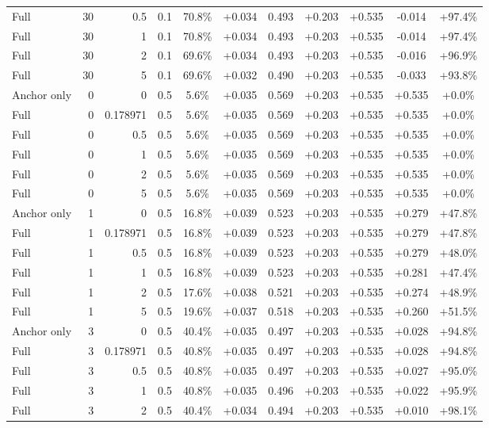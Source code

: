 \begin{table}[htbp]
\begin{tabular}{lrrrccccccc}
Full & 30 & 0.5 & 0.1 & 70.8\% & +0.034 & 0.493 & +0.203 & +0.535 & -0.014 & +97.4\% \\
Full & 30 & 1 & 0.1 & 70.8\% & +0.034 & 0.493 & +0.203 & +0.535 & -0.014 & +97.4\% \\
Full & 30 & 2 & 0.1 & 69.6\% & +0.034 & 0.493 & +0.203 & +0.535 & -0.016 & +96.9\% \\
Full & 30 & 5 & 0.1 & 69.6\% & +0.032 & 0.490 & +0.203 & +0.535 & -0.033 & +93.8\% \\
Anchor only & 0 & 0 & 0.5 & 5.6\% & +0.035 & 0.569 & +0.203 & +0.535 & +0.535 & +0.0\% \\
Full & 0 & 0.178971 & 0.5 & 5.6\% & +0.035 & 0.569 & +0.203 & +0.535 & +0.535 & +0.0\% \\
Full & 0 & 0.5 & 0.5 & 5.6\% & +0.035 & 0.569 & +0.203 & +0.535 & +0.535 & +0.0\% \\
Full & 0 & 1 & 0.5 & 5.6\% & +0.035 & 0.569 & +0.203 & +0.535 & +0.535 & +0.0\% \\
Full & 0 & 2 & 0.5 & 5.6\% & +0.035 & 0.569 & +0.203 & +0.535 & +0.535 & +0.0\% \\
Full & 0 & 5 & 0.5 & 5.6\% & +0.035 & 0.569 & +0.203 & +0.535 & +0.535 & +0.0\% \\
Anchor only & 1 & 0 & 0.5 & 16.8\% & +0.039 & 0.523 & +0.203 & +0.535 & +0.279 & +47.8\% \\
Full & 1 & 0.178971 & 0.5 & 16.8\% & +0.039 & 0.523 & +0.203 & +0.535 & +0.279 & +47.8\% \\
Full & 1 & 0.5 & 0.5 & 16.8\% & +0.039 & 0.523 & +0.203 & +0.535 & +0.279 & +48.0\% \\
Full & 1 & 1 & 0.5 & 16.8\% & +0.039 & 0.523 & +0.203 & +0.535 & +0.281 & +47.4\% \\
Full & 1 & 2 & 0.5 & 17.6\% & +0.038 & 0.521 & +0.203 & +0.535 & +0.274 & +48.9\% \\
Full & 1 & 5 & 0.5 & 19.6\% & +0.037 & 0.518 & +0.203 & +0.535 & +0.260 & +51.5\% \\
Anchor only & 3 & 0 & 0.5 & 40.4\% & +0.035 & 0.497 & +0.203 & +0.535 & +0.028 & +94.8\% \\
Full & 3 & 0.178971 & 0.5 & 40.8\% & +0.035 & 0.497 & +0.203 & +0.535 & +0.028 & +94.8\% \\
Full & 3 & 0.5 & 0.5 & 40.8\% & +0.035 & 0.497 & +0.203 & +0.535 & +0.027 & +95.0\% \\
Full & 3 & 1 & 0.5 & 40.8\% & +0.035 & 0.496 & +0.203 & +0.535 & +0.022 & +95.9\% \\
Full & 3 & 2 & 0.5 & 40.4\% & +0.034 & 0.494 & +0.203 & +0.535 & +0.010 & +98.1\% \\

\end{tabular}
\end{table}
